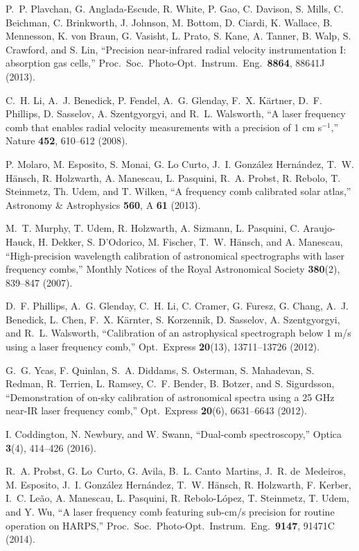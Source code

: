 \documentclass[10pt]{article}
\begin{document}
\begin{thebibliography}{21}
  P.~P. Plavchan, G. Anglada-Escude, R. White, P. Gao, C. Davison, S. Mills, C. Beichman, C. Brinkworth, J. Johnson, M. Bottom, D. Ciardi, K. Wallace, B. Mennesson, K. von Braun, G. Vasisht, L. Prato, S. Kane, A. Tanner, B. Walp, S. Crawford, and S. Lin, ``Precision near-infrared radial velocity instrumentation I: absorption gas cells,'' Proc.\ Soc.\ Photo-Opt.\ Instrum.\ Eng.\ {\bf 8864}, 88641J (2013).
 
  C.~H. Li, A.~J. Benedick, P. Fendel, A.~G. Glenday,
   F.~X. K\"artner, D.~F. Phillips, D. Sasselov, A. Szentgyorgyi, and R.~L. Walsworth, ``A laser frequency comb that enables radial velocity measurements with a precision of 1 cm s$^{-1}$,'' Nature {\bf 452}, 610--612 (2008).
   
  P. Molaro, M. Esposito, S. Monai, G. Lo Curto,
   J.~I. Gonz\'alez Hern\'andez, T.~W. H\"ansch, R. Holzwarth, A. Manescau, L. Pasquini, R.~A. Probst, R. Rebolo, T. Steinmetz, Th. Udem, and T. Wilken, ``A frequency comb calibrated solar atlas,'' Astronomy \& Astrophysics {\bf 560}, A {\bf 61} (2013).  
 
  M.~T. Murphy, T. Udem, R. Holzwarth, A. Sizmann,
   L. Pasquini, C. Araujo-Hauck, H. Dekker, S. D'Odorico, M. Fischer, T.~W. H{\"a}nsch, and A. Manescau, ``High-precision wavelength calibration of astronomical spectrographs with laser frequency combs,'' Monthly Notices of the Royal Astronomical Society {\bf 380}(2), 839--847 (2007).
 
  D.~F. Phillips, A.~G. Glenday, C.~H. Li, C. Cramer,
   G. Furesz, G. Chang, A.~J. Benedick, L. Chen, F.~X. K{\"a}rnter, S. Korzennik, D. Sasselov, A. Szentgyorgyi, and R.~L. Walsworth, ``Calibration of an astrophysical spectrograph below 1 m/s using a laser frequency comb,'' Opt.\ Express {\bf 20}(13), 13711--13726 (2012).
   
  G.~G. Ycas, F. Quinlan, S.~A. Diddams, S. Osterman,
   S. Mahadevan, S. Redman, R. Terrien, L. Ramsey, C.~F. Bender, B. Botzer, and S. Sigurdsson, ``Demonstration of on-sky calibration of astronomical spectra using a 25 GHz near-IR laser frequency comb,'' Opt.\ Express {\bf 20}(6), 6631--6643 (2012).

  I. Coddington, N. Newbury, and W. Swann, ``Dual-comb spectroscopy,'' Optica {\bf 3}(4), 414--426 (2016).
  
  R.~A. Probst, G. Lo~Curto, G. Avila, B.~L. Canto~Martins,
   J.~R. de~Medeiros, M. Esposito,  J.~I. Gonz{\'a}lez Hern{\'a}ndez, T.~W. H{\"a}nsch, R. Holzwarth, F. Kerber, I.~C. Le{\~a}o, A. Manescau, L. Pasquini, R. Rebolo-L{\'o}pez, T. Steinmetz, T. Udem, and Y. Wu, ``A laser frequency comb featuring sub-cm/s precision for routine operation on HARPS,'' Proc.\ Soc.\ Photo-Opt.\ Instrum.\ Eng.\  {\bf 9147}, 91471C (2014).


\end{thebibliography}
\end{document}
